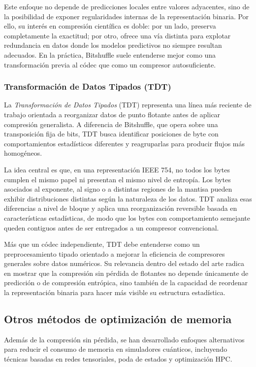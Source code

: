 Este enfoque no depende de predicciones locales entre valores adyacentes, sino de la
posibilidad de exponer regularidades internas de la representación binaria. Por ello, su
interés en compresión científica es doble: por un lado, preserva completamente la
exactitud; por otro, ofrece una vía distinta para explotar redundancia en datos donde los
modelos predictivos no siempre resultan adecuados. En la práctica, Bitshuffle suele
entenderse mejor como una transformación previa al códec que como un compresor
autosuficiente.

\subsubsection{Transformación de Datos Tipados (TDT)}

La \textit{Transformación de Datos Tipados} (TDT)\cite{jamalidinan2025tdt} representa
una línea más reciente de trabajo orientada a reorganizar datos de punto flotante antes
de aplicar compresión generalista. A diferencia de Bitshuffle, que opera sobre una
transposición fija de bits, TDT busca identificar posiciones de byte con comportamientos
estadísticos diferentes y reagruparlas para producir flujos más homogéneos.

La idea central es que, en una representación IEEE 754, no todos los bytes cumplen el
mismo papel ni presentan el mismo nivel de entropía. Los bytes asociados al exponente,
al signo o a distintas regiones de la mantisa pueden exhibir distribuciones distintas
según la naturaleza de los datos. TDT analiza esas diferencias a nivel de bloque y aplica
una reorganización reversible basada en características estadísticas, de modo que los
bytes con comportamiento semejante queden contiguos antes de ser entregados a un
compresor convencional.

Más que un códec independiente, TDT debe entenderse como un preprocesamiento
tipado orientado a mejorar la eficiencia de compresores generales sobre datos
numéricos. Su relevancia dentro del estado del arte radica en mostrar que la compresión
sin pérdida de flotantes no depende únicamente de predicción o de compresión
entrópica, sino también de la capacidad de reordenar la representación binaria para
hacer más visible su estructura estadística.

\subsection{\normalsize{Otros métodos de optimización de memoria}}
Además de la compresión sin pérdida, se han desarrollado enfoques alternativos
para reducir el consumo de memoria en simuladores cuánticos, incluyendo
técnicas basadas en redes tensoriales, poda de estados y optimización HPC.

